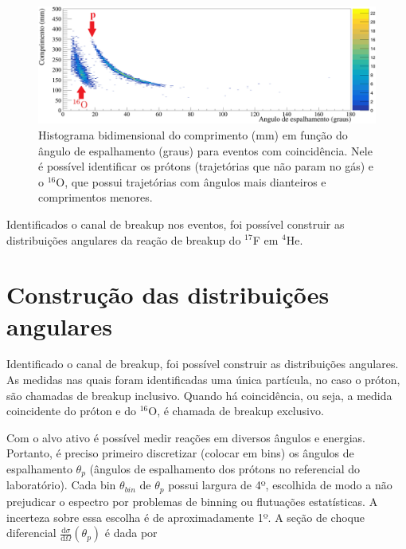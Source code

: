 \documentclass[a4paper,12pt,oneside]{book}
\begin{document}
\begin{figure}[H]
    \centering
    \includegraphics[scale = 1., width=\columnwidth]{figs/comp_vs_ang_n2_coinc_cut12.png}
    \caption{Histograma bidimensional do comprimento (mm) em função do ângulo de espalhamento (graus) para eventos com coincidência. Nele é possível identificar os prótons (trajetórias que não param no gás) e o $^{16}$O, que possui trajetórias com ângulos mais dianteiros e comprimentos menores.}
    \label{fig:comp_vs_ang_coinc}
\end{figure}

\par Identificados o canal de breakup nos eventos, foi possível construir as distribuições angulares da reação de breakup do $^{17}$F em $^4$He.

\section{Construção das distribuições angulares}\label{sec:sec_choque}

\par Identificado o canal de breakup, foi possível construir as distribuições angulares. As medidas nas quais foram identificadas uma única partícula, no caso o próton, são chamadas de breakup inclusivo. Quando há coincidência, ou seja, a medida coincidente do próton e do $^{16}$O, é chamada de breakup exclusivo.


\par Com o alvo ativo é possível medir reações em diversos ângulos e energias. Portanto, é preciso primeiro discretizar (colocar em bins) os ângulos de espalhamento $\theta_p$ (ângulos de espalhamento dos prótons no referencial do laboratório). Cada bin $\theta_{bin}$ de $\theta_p$ possui largura de 4º, escolhida de modo a não prejudicar o espectro por problemas de binning ou flutuações estatísticas. A incerteza sobre essa escolha é de aproximadamente 1º. A seção de choque diferencial $\frac{\mathrm{d}\sigma}{\mathrm{d}\Omega} (\theta_p)$ é dada por \cite{zamora_mater}
\end{document}
